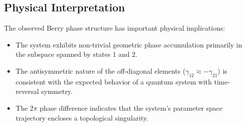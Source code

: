 \documentclass{article}
\begin{document}
\subsection{Physical Interpretation}

The observed Berry phase structure has important physical implications:

\begin{itemize}
    \item The system exhibits non-trivial geometric phase accumulation primarily in the subspace spanned by states 1 and 2.
    
    \item The antisymmetric nature of the off-diagonal elements ($\gamma_{12} \approx -\gamma_{21}$) is consistent with the expected behavior of a quantum system with time-reversal symmetry.
    
    \item The $2\pi$ phase difference indicates that the system's parameter space trajectory encloses a topological singularity.
\end{itemize}
\end{document}
